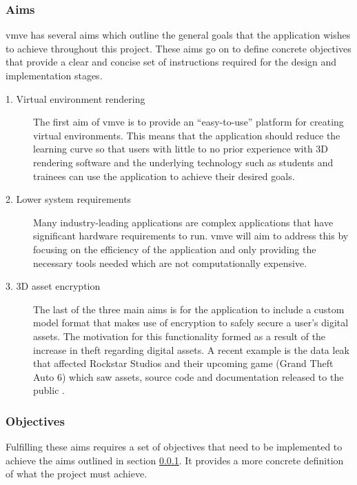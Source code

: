 \documentclass[11pt]{article}
\begin{document}
\subsubsection{Aims} \label{aims} 

\gls*{vmve} has several aims which outline the general goals that the
application wishes to achieve throughout this project. These aims go on to
define concrete objectives that provide a clear and concise set of instructions
required for the design and implementation stages.


\begin{description}
  \item[1. Virtual environment rendering] The first aim of \gls*{vmve} is to
    provide an ``easy-to-use'' platform for creating virtual environments. This
    means that the application should reduce the learning curve so that users
    with little to no prior experience with 3D rendering software and the
    underlying technology such as students and trainees can use the application
    to achieve their desired goals.

  \item[2. Lower system requirements] Many industry-leading applications are
    complex applications that have significant hardware requirements to run.
    \gls*{vmve} will aim to address this by focusing on the efficiency of the
    application and only providing the necessary tools needed which are not
    computationally expensive.

  \item[3. 3D asset encryption] The last of the three main aims is for the
    application to include a custom model format that makes use of encryption to
    safely secure a user's digital assets. The motivation for this functionality
    formed as a result of the increase in theft regarding digital assets. A
    recent example is the data leak that affected Rockstar Studios and their
    upcoming game (Grand Theft Auto 6) which saw assets, source code and
    documentation released to the public \cite{gta_leak}.

\end{description}


\subsubsection{Objectives} \label{objectives} 

Fulfilling these aims requires a set of objectives that need to be implemented
to achieve the aims outlined in section \ref{aims}. It provides a more concrete
definition of what the project must achieve.
\end{document}
